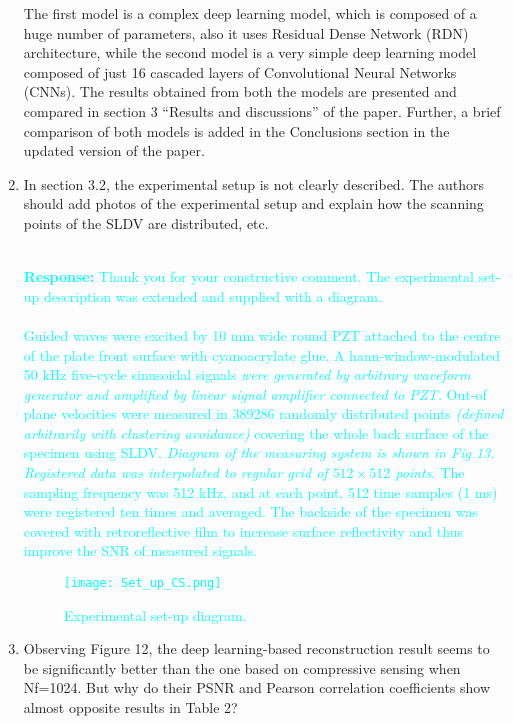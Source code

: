 \documentclass[11pt,a2paper]{report}
\begin{document}
\begin{enumerate}
{			The first model is a complex deep learning model, which is composed of a huge number of parameters, also it uses Residual Dense Network (RDN) architecture, while the second model is a very simple deep learning model composed of just 16 cascaded layers of Convolutional Neural Networks (CNNs). 
			The results obtained from both the models are presented and compared in section 3 \enquote{Results and discussions} of the paper. Further, a brief comparison of both models is added in the Conclusions section in the updated version of the paper.			
		}
		\item In section 3.2, the experimental setup is not clearly described. 
		The authors should add photos of the experimental setup and explain how the scanning points of the SLDV are distributed, etc.
		\\ \\ 
		\textcolor{Cyan}
		{
			\textbf{Response:}
			Thank you for your constructive comment.
			The experimental set-up description was extended and supplied with a diagram. \\ \\
			Guided waves were excited by 10 mm wide round PZT attached to the centre of the plate front surface with cyanoacrylate glue. 
			A hann-window-modulated 50 kHz five-cycle sinusoidal signals \emph{were generated by arbitrary waveform generator and amplified by linear signal amplifier connected to PZT.} 
			Out-of plane velocities were measured in 389286 randomly distributed points \emph{(defined arbitrarily with clustering avoidance)} covering the whole back surface of the specimen using SLDV. 
			\emph{
				Diagram of the measuring system is shown in Fig 13. 
				Registered data was interpolated to regular grid of \(512\times512\) points.}
			The sampling frequency was 512 kHz, and at each point, 512 time samples (1 ms) were registered ten times and averaged. 
			The backside of the specimen was covered with retroreflective film to increase surface reflectivity and thus improve the SNR of measured signals.
			\setcounter{figure}{12}
			\begin{figure} [!h]
				\centering
				\texttt{[image: Set\_up\_CS.png]}
				\caption{\textcolor{Cyan}{Experimental set-up diagram.}}
				\label{fig:exp_setup}
			\end{figure}
		}
		\item  Observing Figure 12, the deep learning-based reconstruction result seems to be significantly better than the one based on compressive sensing when Nf=1024. 
		But why do their PSNR and Pearson correlation coefficients show almost opposite results in Table 2?

\end{enumerate}
\end{document}
